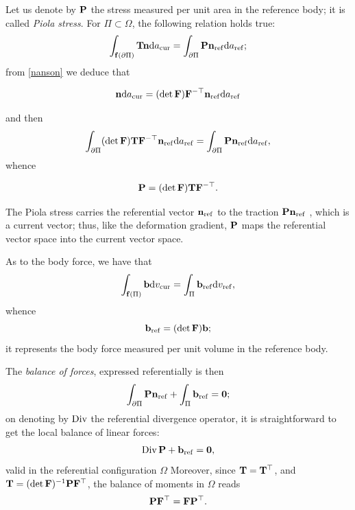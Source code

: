 Let us denote by $\mathbf{P}$ the stress measured per unit area in the reference body; it is called \textit{Piola stress}. For $\Pi \subset \Omega$, the following relation holds true:
\begin{equation}
	\int_{\mathbf{f}(\partial\Pi)}\mathbf{T}\mathbf{n}\mathrm{d} a_{\rm cur}=\int_{\partial\Pi}\mathbf{P}\mathbf{n}_{\rm ref}\mathrm{d} a_{\rm ref};
\end{equation}
from \eqref{nanson} we deduce that

\begin{equation}
	\mathbf{n}\mathrm{d} a_{\rm cur}=(\det\mathbf{F})\mathbf{F}^{-\top}\mathbf{n}_{\rm ref}\mathrm{d} a_{\rm ref}
\end{equation}

and then
\begin{equation}
	\int_{\partial\Pi}(\det\mathbf{F})\mathbf{T}\mathbf{F}^{-\top}\mathbf{n}_{\rm ref}\mathrm{d} a_{\rm ref}=\int_{\partial\Pi}\mathbf{P}\mathbf{n}_{\rm ref}\mathrm{d} a_{\rm ref},
\end{equation}
whence
\begin{definition}
\begin{equation}\label{Pio}
	\mathbf{P}=(\det\mathbf{F})\mathbf{T}\mathbf{F}^{-\top}.
\end{equation}
\end{definition}
The Piola stress  carries the referential vector $\mathbf{n}_{\rm ref}$ to the traction $\mathbf{P}\mathbf{n}_{\rm ref}$ , which is a current vector; thus, like the deformation gradient, $\mathbf{P}$ maps  the referential vector space  into the current vector space.

As to the body force, we have that
\begin{equation}
	\int_{\mathbf{f}(\Pi)}\mathbf{b}\mathrm{d} v_{\rm cur}=\int_{\Pi}\mathbf{b}_{\rm ref}\mathrm{d} v_{\rm ref},
\end{equation}
whence
\begin{equation}
	\mathbf{b}_{\rm ref}=(\det\mathbf{F})\mathbf{b};
\end{equation}
it represents the  body force measured per unit volume in the reference body.

The \textit{balance of forces}, expressed referentially is then
\begin{equation}
	\int_{\partial\Pi}\mathbf{P}\mathbf{n}_{\rm ref}+\int_{\Pi}\mathbf{b}_{\rm ref}=\mathbf{0};
\end{equation}
on denoting by $\operatorname{Div}$ the referential divergence operator, it is straightforward to get the local balance of linear forces:
\begin{equation}
	\operatorname{Div}\mathbf{P}+\mathbf{b}_{\rm ref}=\mathbf{0},
\end{equation} 
valid in the referential configuration $\Omega$
Moreover, since $\mathbf{T}=\mathbf{T}^\top$, and $\mathbf{T}=(\det\mathbf{F})^{-1}\mathbf{P}\mathbf{F}^\top$, the balance of moments in $\Omega$ reads
\begin{equation}
	\mathbf{P}\mathbf{F}^\top=\mathbf{F}\mathbf{P}^\top.
\end{equation}


